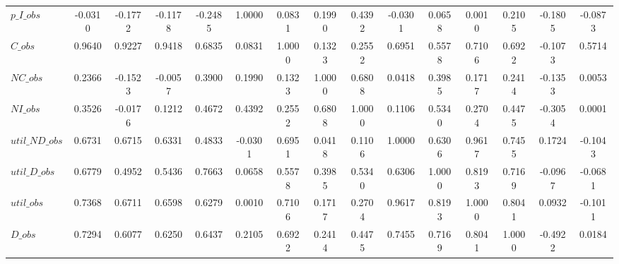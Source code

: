 \begin{center}
\begin{longtable}{lcccccccccccccc}
$p\_I\_obs      $	 & 	          -0.0310	 & 	          -0.1772	 & 	          -0.1178	 & 	          -0.2485	 & 	           1.0000	 & 	           0.0831	 & 	           0.1990	 & 	           0.4392	 & 	          -0.0301	 & 	           0.0658	 & 	           0.0010	 & 	           0.2105	 & 	          -0.1805	 & 	          -0.0873 \\ 
$C\_obs         $	 & 	           0.9640	 & 	           0.9227	 & 	           0.9418	 & 	           0.6835	 & 	           0.0831	 & 	           1.0000	 & 	           0.1323	 & 	           0.2552	 & 	           0.6951	 & 	           0.5578	 & 	           0.7106	 & 	           0.6922	 & 	          -0.1073	 & 	           0.5714 \\ 
$NC\_obs        $	 & 	           0.2366	 & 	          -0.1523	 & 	          -0.0057	 & 	           0.3900	 & 	           0.1990	 & 	           0.1323	 & 	           1.0000	 & 	           0.6808	 & 	           0.0418	 & 	           0.3985	 & 	           0.1717	 & 	           0.2414	 & 	          -0.1353	 & 	           0.0053 \\ 
$NI\_obs        $	 & 	           0.3526	 & 	          -0.0176	 & 	           0.1212	 & 	           0.4672	 & 	           0.4392	 & 	           0.2552	 & 	           0.6808	 & 	           1.0000	 & 	           0.1106	 & 	           0.5340	 & 	           0.2704	 & 	           0.4475	 & 	          -0.3054	 & 	           0.0001 \\ 
$util\_ND\_obs  $	 & 	           0.6731	 & 	           0.6715	 & 	           0.6331	 & 	           0.4833	 & 	          -0.0301	 & 	           0.6951	 & 	           0.0418	 & 	           0.1106	 & 	           1.0000	 & 	           0.6306	 & 	           0.9617	 & 	           0.7455	 & 	           0.1724	 & 	          -0.1043 \\ 
$util\_D\_obs   $	 & 	           0.6779	 & 	           0.4952	 & 	           0.5436	 & 	           0.7663	 & 	           0.0658	 & 	           0.5578	 & 	           0.3985	 & 	           0.5340	 & 	           0.6306	 & 	           1.0000	 & 	           0.8193	 & 	           0.7169	 & 	          -0.0967	 & 	          -0.0681 \\ 
$util\_obs      $	 & 	           0.7368	 & 	           0.6711	 & 	           0.6598	 & 	           0.6279	 & 	           0.0010	 & 	           0.7106	 & 	           0.1717	 & 	           0.2704	 & 	           0.9617	 & 	           0.8193	 & 	           1.0000	 & 	           0.8041	 & 	           0.0932	 & 	          -0.1011 \\ 
$D\_obs         $	 & 	           0.7294	 & 	           0.6077	 & 	           0.6250	 & 	           0.6437	 & 	           0.2105	 & 	           0.6922	 & 	           0.2414	 & 	           0.4475	 & 	           0.7455	 & 	           0.7169	 & 	           0.8041	 & 	           1.0000	 & 	          -0.4922	 & 	           0.0184 \\ 

\end{longtable}
\end{center}

